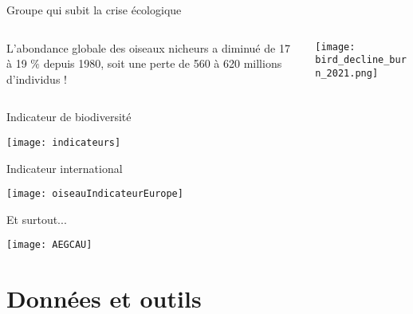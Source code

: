 \documentclass[10pt]{beamer}
\begin{document}
\begin{frame}{Groupe qui subit la crise écologique}
\begin{columns}[c]
    \begin{column}[c]{0.5\textwidth}
      L'abondance globale des oiseaux nicheurs a diminué de 17 à 19 $\%$ depuis 1980, soit une perte de 560 à 620 millions d'individus !
    \end{column}
    \begin{column}[c]{0.5\textwidth}
      \begin{center}
    \texttt{[image: bird\_decline\_burn\_2021.png]} 
  \end{center}
        \end{column}
  \end{columns}
\begin{tiny}
\cite{Burns2021}
\end{tiny}
\end{frame}


\begin{frame}{Indicateur de biodiversité}
  \begin{center}
    \texttt{[image: indicateurs]} 
  \end{center}
\tiny{\cite{Balmford2005,Donald2001,Donald2002,Doxa2010,Fisher2009,Gregory2005,Sekercioglu2004,Weibull2003}}
\end{frame}

\begin{frame}{Indicateur international}
  \begin{center}
    \texttt{[image: oiseauIndicateurEurope]} 
  \end{center}
\end{frame}





\begin{frame}{Et surtout...}
  \begin{center}
    \texttt{[image: AEGCAU]} 
  \end{center}
\end{frame}

\section{Données et outils}
\end{document}
